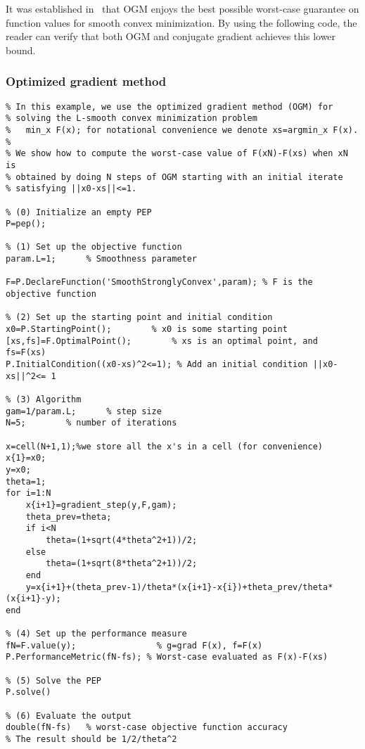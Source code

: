 \documentclass[11pt,a4paper]{article}
\begin{document}
It was established in~\cite{drori2017exact} that OGM enjoys the best possible worst-case guarantee on function values for smooth convex minimization. By using the following code, the reader can verify that both OGM and conjugate gradient achieves this lower bound.
\subsubsection{Optimized gradient method}
\begin{lstlisting}
% In this example, we use the optimized gradient method (OGM) for
% solving the L-smooth convex minimization problem
%   min_x F(x); for notational convenience we denote xs=argmin_x F(x).
%
% We show how to compute the worst-case value of F(xN)-F(xs) when xN is
% obtained by doing N steps of OGM starting with an initial iterate
% satisfying ||x0-xs||<=1.

% (0) Initialize an empty PEP
P=pep();

% (1) Set up the objective function
param.L=1;      % Smoothness parameter

F=P.DeclareFunction('SmoothStronglyConvex',param); % F is the objective function

% (2) Set up the starting point and initial condition
x0=P.StartingPoint();		 % x0 is some starting point
[xs,fs]=F.OptimalPoint(); 		 % xs is an optimal point, and fs=F(xs)
P.InitialCondition((x0-xs)^2<=1); % Add an initial condition ||x0-xs||^2<= 1

% (3) Algorithm
gam=1/param.L;		% step size
N=5;		% number of iterations

x=cell(N+1,1);%we store all the x's in a cell (for convenience)
x{1}=x0;
y=x0;
theta=1;
for i=1:N
	x{i+1}=gradient_step(y,F,gam);
	theta_prev=theta;
	if i<N
		theta=(1+sqrt(4*theta^2+1))/2;
	else
		theta=(1+sqrt(8*theta^2+1))/2;
	end
	y=x{i+1}+(theta_prev-1)/theta*(x{i+1}-x{i})+theta_prev/theta*(x{i+1}-y);
end

% (4) Set up the performance measure
fN=F.value(y);                % g=grad F(x), f=F(x)
P.PerformanceMetric(fN-fs); % Worst-case evaluated as F(x)-F(xs)

% (5) Solve the PEP
P.solve()

% (6) Evaluate the output
double(fN-fs)   % worst-case objective function accuracy
% The result should be 1/2/theta^2
\end{lstlisting}
\newpage
\end{document}
